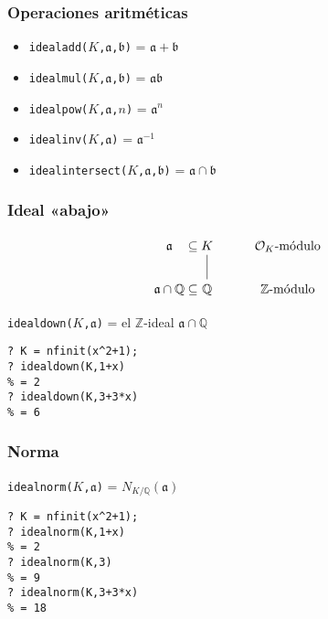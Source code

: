\documentclass{beamer}
\newcommand{\ZZ}{\mathbb{Z}}
\newcommand{\QQ}{\mathbb{Q}}
\renewcommand{\O}{\mathcal{O}}
\begin{document}

\begin{frame}[fragile]
  \frametitle{Operaciones aritméticas}

  \begin{itemize}
  \item \texttt{idealadd($K$,$\mathfrak{a}$,$\mathfrak{b}$)} = $\mathfrak{a}+\mathfrak{b}$
  \item \texttt{idealmul($K$,$\mathfrak{a}$,$\mathfrak{b}$)} = $\mathfrak{a}\mathfrak{b}$
  \item \texttt{idealpow($K$,$\mathfrak{a}$,$n$)} = $\mathfrak{a}^n$
  \item \texttt{idealinv($K$,$\mathfrak{a}$)} = $\mathfrak{a}^{-1}$
  \item \texttt{idealintersect($K$,$\mathfrak{a}$,$\mathfrak{b}$)} = $\mathfrak{a} \cap \mathfrak{b}$
  \end{itemize}
\end{frame}


\begin{frame}[fragile]
  \frametitle{Ideal «abajo»}

  \[ \begin{tikzcd}
    \mathfrak{a} &[-3em] \subseteq &[-3em] K\ar[-]{d} & \O_K\text{-módulo} \\
    \mathfrak{a}\cap \QQ & \subseteq & \QQ & \ZZ\text{-módulo}
    \end{tikzcd} \]

  \begin{center}
    \texttt{idealdown($K$,$\mathfrak{a}$)} = el $\ZZ$-ideal $\mathfrak{a} \cap \QQ$
  \end{center}

  \begin{shaded}
\begin{verbatim}
? K = nfinit(x^2+1);
? idealdown(K,1+x)
% = 2
? idealdown(K,3+3*x)
% = 6
\end{verbatim}
  \end{shaded}
\end{frame}


\begin{frame}[fragile]
  \frametitle{Norma}

  \begin{center}
    \texttt{idealnorm($K$,$\mathfrak{a}$)} = $N_{K/\QQ} (\mathfrak{a})$
  \end{center}

  \begin{shaded}
\begin{verbatim}
? K = nfinit(x^2+1);
? idealnorm(K,1+x)
% = 2
? idealnorm(K,3)
% = 9
? idealnorm(K,3+3*x)
% = 18
\end{verbatim}
  \end{shaded}
\end{frame}
\end{document}
